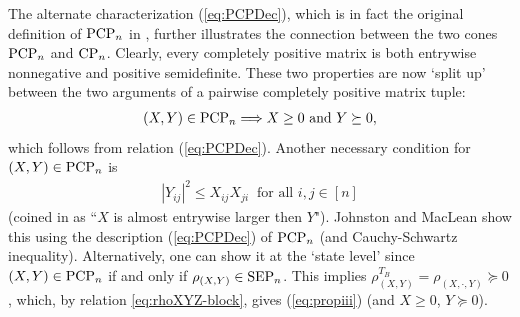 \documentclass[11pt]{article}
\newcommand{\Herm}{\mathrm{Herm}}
\newcommand{\PCP}{\text{\rm PCP}}
\newcommand{\SEP}{\text{\rm SEP}}
\newcommand{\CP}{\text{\rm CP}}
\newcommand{\CLDUI}{\text{\rm CLDUI}}
\newcommand{\DPS}{\text{\rm DPS}}
\theoremstyle{plain}
\newtheorem{lemma}[satz]{Lemma}
\begin{document}
The alternate characterization (\ref{eq:PCPDec}), which is in fact the original definition of $\PCP_n$ in \cite{JML-PCP}, further illustrates %
the connection between the two cones $\PCP_n$ and $\CP_n$. Clearly, every completely positive matrix is both entrywise nonnegative and positive semidefinite. These two properties are now `split up' between the two arguments of a pairwise completely positive matrix tuple: 
\begin{align*}
(X,Y)\in \PCP_n \Longrightarrow X\ge 0 \text{ and } Y\succeq 0,
\end{align*}
 which  follows  from relation (\ref{eq:PCPDec}).
Another necessary condition for $(X,Y)\in \PCP_n$ is 
\begin{align}\label{eq:propiii}
|Y_{ij}|^2\leq X_{ij}X_{ji} \ \text{  for all } i,j\in[n]
\end{align}
(coined in \cite{JML-PCP} as ``$X$ is almost entrywise larger then $Y$").
%
%
%
Johnston and MacLean \cite{JML-PCP} show this using the description (\ref{eq:PCPDec}) of $\PCP_n$ (and Cauchy-Schwartz inequality). Alternatively, one can show it at the `state level' since $(X,Y)\in\PCP_n$ if and only if $\rho_{(X,Y)}\in \SEP_n$. This implies %
$\rho_{(X,Y)}^{T_B}=\rho_{(X,\cdot,Y)}\succeq 0$, which, by relation \eqref{eq:rhoXYZ-block}, gives (\ref{eq:propiii}) (and $X\ge 0$, $Y\succeq 0$).
\end{document}
